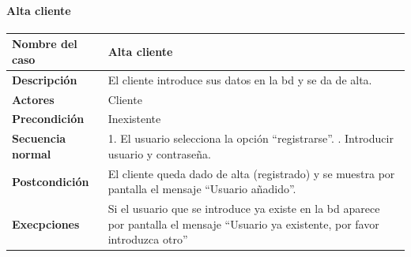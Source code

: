 \paragraph{Alta cliente}
\begin{table}[H]
    \centering
    \small
    \begin{tabularx}{0.8\textwidth}{|p{3.5cm}|X|}
        \hline
        \rowcolor{lightgray}
        \textbf{Nombre del caso}  & \textbf{Alta cliente}                                                                                                                       \\
        \hline
        \textbf{Descripción}      & El cliente introduce sus datos en la \gls{bd} y se da de alta.                                                                              \\
        \hline
        \textbf{Actores}          & Cliente                                                                                                                                     \\
        \hline
        \textbf{Precondición}     & Inexistente                                                                                                                                 \\
        \hline
        \textbf{Secuencia normal} & 1. El usuario selecciona la opción ``registrarse''. \newline
        2. Introducir usuario y contraseña.                                                                                                                                     \\
        \hline
        \textbf{Postcondición}    & El cliente queda dado de alta (registrado) y se muestra por pantalla el mensaje ``Usuario añadido''.                                        \\
        \hline
        \textbf{Execpciones}      & Si el usuario que se introduce ya existe en la \gls{bd} aparece por pantalla el mensaje ``Usuario ya existente, por favor introduzca otro'' \\
        \hline
    \end{tabularx}
\end{table}
